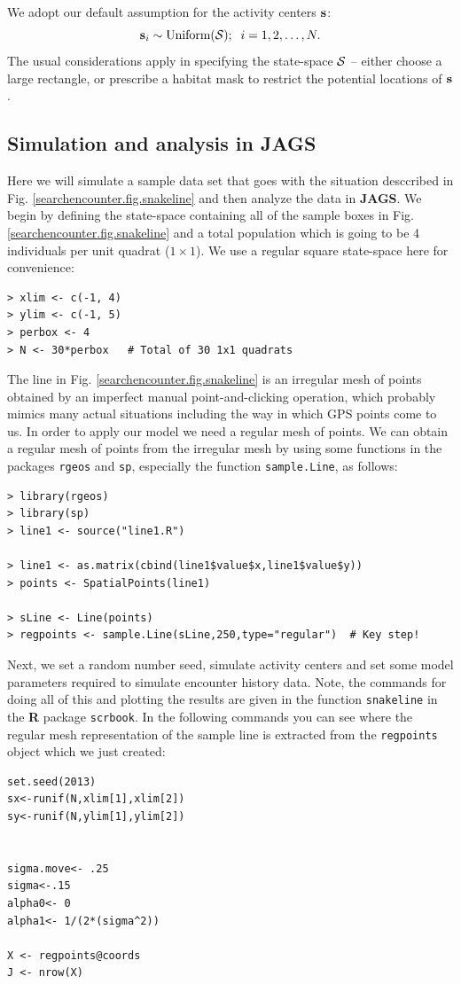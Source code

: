 We adopt our default assumption for the activity centers ${\bf s}$:
\[
 {\bf s}_{i} \sim \mbox{Uniform}({\cal S}); \; \; i=1,2,\ldots,N.
\]
The usual considerations apply in specifying the state-space ${\cal
  S}$ -- either choose a large rectangle, or prescribe a habitat mask
to restrict the potential locations of ${\bf s}$.



\subsection{Simulation and analysis in {\bf JAGS}}

Here we will simulate a sample data set that goes with the situation
desccribed in Fig. \ref{searchencounter.fig.snakeline} and then analyze the data in
{\bf JAGS}.  We begin by defining the state-space containing all of
the sample boxes in Fig. \ref{searchencounter.fig.snakeline} and a total population
which is going to be 4 individuals per unit quadrat
($1 \times 1$). We use a regular square state-space here for
convenience:
\begin{verbatim}
> xlim <- c(-1, 4)
> ylim <- c(-1, 5)
> perbox <- 4
> N <- 30*perbox   # Total of 30 1x1 quadrats
\end{verbatim}
The line in Fig. \ref{searchencounter.fig.snakeline}  is an irregular mesh of points
obtained by an imperfect manual point-and-clicking operation, which
probably mimics many actual situations including the way in which GPS
points come to us. In order to apply our model we need a regular mesh
of points. We can obtain a regular mesh of points from the irregular
mesh by using
some functions in the packages \mbox{\tt rgeos}
and \mbox{\tt sp}, especially the function \mbox{\tt sample.Line}, as follows:
\begin{verbatim}
> library(rgeos)
> library(sp)
> line1 <- source("line1.R")

> line1 <- as.matrix(cbind(line1$value$x,line1$value$y))
> points <- SpatialPoints(line1)

> sLine <- Line(points)
> regpoints <- sample.Line(sLine,250,type="regular")  # Key step!
\end{verbatim}
Next, we set a random number seed, simulate activity centers and set
some model parameters required to simulate encounter history data.
Note, the commands for doing all of this and plotting the results are given
in the function \mbox{\tt snakeline} in the {\bf R} package
\mbox{\tt scrbook}. 
In the following commands you can see where the
regular mesh representation of the sample line is extracted from the
\mbox{\tt regpoints} object which we just created:
{\small
\begin{verbatim}
set.seed(2013)
sx<-runif(N,xlim[1],xlim[2])
sy<-runif(N,ylim[1],ylim[2])


sigma.move<- .25
sigma<-.15
alpha0<- 0
alpha1<- 1/(2*(sigma^2))

X <- regpoints@coords
J <- nrow(X)
\end{verbatim}
}

